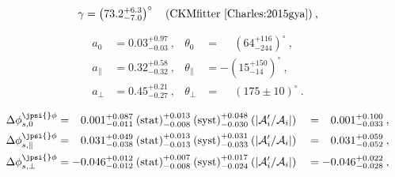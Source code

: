 

%
\begin{equation}\label{Eq:Gamma_GC}
\gamma  = \left(73.2_{-7.0}^{+6.3}\right)^{\circ} \quad\text{(CKMfitter \cite{Charles:2015gya})}\:,
\end{equation}


\begin{align}
a_0 & = 0.03^{+0.97}_{-0.03}\:, & \theta_0 & = \phantom{-}\left(64^{+116}_{-244}\right)^{\circ}\:,\\
%
a_\parallel & = 0.32^{+0.58}_{-0.32}\:, & \theta_\parallel & = -\left(15^{+150}_{-14}\right)^{\circ}\:,\\
%
a_\perp & = 0.45^{+0.21}_{-0.27}\:, & \theta_\perp & = \phantom{-}\left(175 \pm 10\right)^{\circ}\:.
\end{align}



\begin{alignat}{2}
\Delta\phi^{\jpsi{}\phi}_{s,0} & =
\phantom{-}0.001^{+0.087}_{-0.011}\:\text{(stat)}^{+0.013}_{-0.008}\:\text{(syst)}^{+0.048}_{-0.030}\:(|\mathcal{A}'_i/\mathcal{A}_i|)
&& = \phantom{-}0.001^{+0.100}_{-0.033}\:,\\
%
\Delta\phi^{\jpsi{}\phi}_{s,\parallel} & =
\phantom{-}0.031^{+0.049}_{-0.038}\:\text{(stat)}^{+0.013}_{-0.013}\:\text{(syst)}^{+0.031}_{-0.033}\:(|\mathcal{A}'_i/\mathcal{A}_i|)
&& = \phantom{-}0.031^{+0.059}_{-0.052}\:,\\
%
\Delta\phi^{\jpsi{}\phi}_{s,\perp} & =
-0.046^{+0.012}_{-0.012}\:\text{(stat)}^{+0.007}_{-0.008}\:\text{(syst)}^{+0.017}_{-0.024}\:(|\mathcal{A}'_i/\mathcal{A}_i|)
&& = -0.046^{+0.022}_{-0.028}\:,
\end{alignat}
